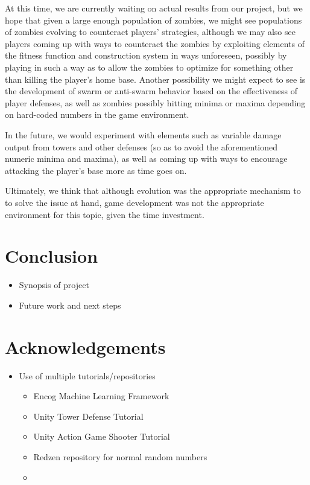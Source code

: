\documentclass[letterpaper]{article}
\begin{document}
At this time, we are currently waiting on actual results from our project, but we hope that given a large enough population of zombies, we might see populations of zombies evolving to counteract players' strategies, although we may also see players coming up with ways to counteract the zombies by exploiting elements of the fitness function and construction system in ways unforeseen, possibly by playing in such a way as to allow the zombies to optimize for something other than killing the player's home base. Another possibility we might expect to see is the development of swarm or anti-swarm behavior based on the effectiveness of player defenses, as well as zombies possibly hitting minima or maxima depending on hard-coded numbers in the game environment.

In the future, we would experiment with elements such as variable damage output from towers and other defenses (so as to avoid the aforementioned numeric minima and maxima), as well as coming up with ways to encourage attacking the player's base more as time goes on.

Ultimately, we think that although evolution was the appropriate mechanism to to solve the issue at hand, game development was not the appropriate environment for this topic, given the time investment.

\section{Conclusion}
\begin{itemize}
    \item Synopsis of project
    \item Future work and next steps
\end{itemize}

\section{Acknowledgements}
\begin{itemize}
    \item Use of multiple tutorials/repositories
    \begin{itemize}
        \item Encog Machine Learning Framework
        \item Unity Tower Defense Tutorial
        \item Unity Action Game Shooter Tutorial
        \item Redzen repository for normal random numbers
        \item 
    \end{itemize}
\end{itemize}

\footnotesize

\end{document}
